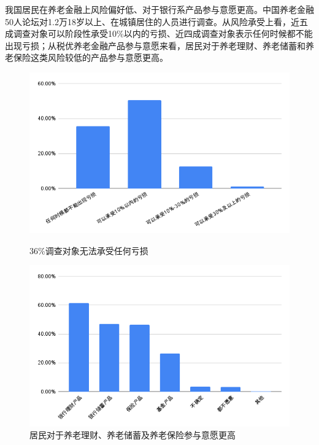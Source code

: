 \documentclass[a4paper,10.5pt]{ctexart}
\begin{document}
我国居民在养老金融上风险偏好低、对于银行系产品参与意愿更高。中国养老金融50人论坛对1.2万18岁以上、在城镇居住的人员进行调查。从风险承受上看，近五成调查对象可以阶段性承受10\%以内的亏损、近四成调查对象表示任何时候都不能出现亏损；从税优养老金融产品参与意愿来看，居民对于养老理财、养老储蓄和养老保险这类风险较低的产品参与意愿更高。
\begin{figure}[H]
    \begin{minipage}{0.48\linewidth}
        \includegraphics[width=\linewidth]{img/36调查对象无法承受任何亏损.png}
        \caption{36\%调查对象无法承受任何亏损}
    \end{minipage}
    \begin{minipage}{0.48\linewidth}
        \includegraphics[width=\linewidth]{img/居民对于养老理财、养老储蓄及养老保险参与意愿更高.png}
        \caption{居民对于养老理财、养老储蓄及养老保险参与意愿更高}
    \end{minipage}
\end{figure}
\end{document}
